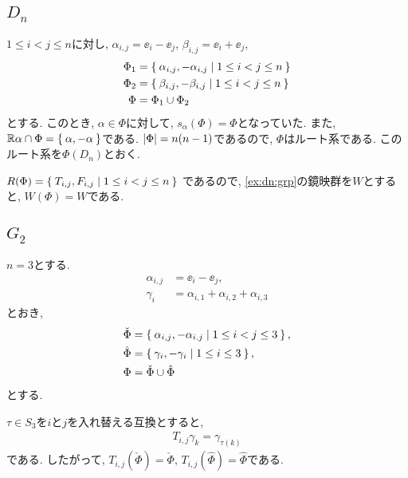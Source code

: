 \subsection{$D_{n}$}
\label{ex:dn:root}
$1\leq i<j\leq n$に対し,
$\alpha_{i,j}=\ee_i-\ee_j$,
$\beta_{i,j}=\ee_i+\ee_j$,
\begin{align*}
  \Phi_1&=\Set{\alpha_{i,j},-\alpha_{i,j}|1\leq i<j\leq n}\\
  \Phi_2&=\Set{\beta_{i,j},-\beta_{i,j}|1\leq i<j\leq n}\\
  \Phi&=\Phi_1\cup \Phi_2
\end{align*}
とする.
このとき,
$\alpha\in \Phi$に対して,
$s_\alpha(\Phi)=\Phi$となっていた.
また,
$\mathbb{R}\alpha\cap\Phi=\Set{\alpha,-\alpha}$である.
$\left|\Phi\right|=n(n-1)$であるので,
$\Phi$はルート系である.
このルート系を$\Phi(D_{n})$とおく.

$R(\Phi)=\Set{T_{i,j},F_{i,j}|1\leq i< j\leq n}$
であるので,
\cref{ex:dn:grp}の鏡映群を$W$とすると,
$W(\Phi)=W$である.

\subsection{$G_2$}
$n=3$とする.
\begin{align*}
  \alpha_{i,j}&=\ee_i-\ee_j,\\
  \gamma_{i}&=\alpha_{i,1}+\alpha_{i,2}+\alpha_{i,3}
\end{align*}
とおき,
\begin{align*}
  \check\Phi&=\Set{\alpha_{i,j},-\alpha_{i.j}|1\leq i<j\leq 3},\\
  \hat\Phi&=\Set{\gamma_{i},-\gamma_{i}|1\leq i\leq 3},\\
  \Phi&=\check\Phi\cup\hat\Phi
\end{align*}
とする.

$\tau\in S_3$を$i$と$j$を入れ替える互換とすると,
\begin{align*}
  T_{i,j}\gamma_k=\gamma_{\tau(k)}
\end{align*}
である. したがって,
$T_{i,j}(\check\Phi)=\check\Phi$,
$T_{i,j}(\hat\Phi)=\hat\Phi$である.

